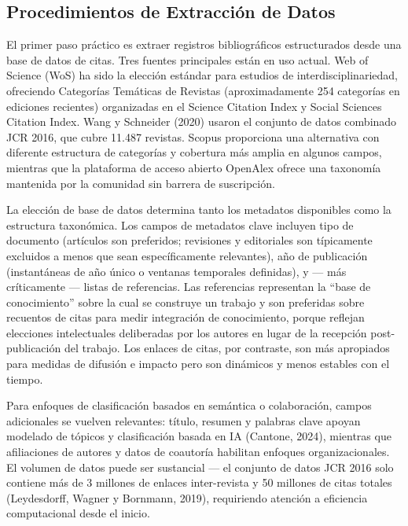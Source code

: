 \documentclass[
]{article}
\begin{document}
\hypertarget{procedimientos-de-extracciuxf3n-de-datos}{%
\subsection{Procedimientos de Extracción de
Datos}\label{procedimientos-de-extracciuxf3n-de-datos}}

El primer paso práctico es extraer registros bibliográficos
estructurados desde una base de datos de citas. Tres fuentes principales
están en uso actual. Web of Science (WoS) ha sido la elección estándar
para estudios de interdisciplinariedad, ofreciendo Categorías Temáticas
de Revistas (aproximadamente 254 categorías en ediciones recientes)
organizadas en el Science Citation Index y Social Sciences Citation
Index. Wang y Schneider (2020) usaron el conjunto de datos combinado JCR
2016, que cubre 11.487 revistas. Scopus proporciona una alternativa con
diferente estructura de categorías y cobertura más amplia en algunos
campos, mientras que la plataforma de acceso abierto OpenAlex ofrece una
taxonomía mantenida por la comunidad sin barrera de suscripción.

La elección de base de datos determina tanto los metadatos disponibles
como la estructura taxonómica. Los campos de metadatos clave incluyen
tipo de documento (artículos son preferidos; revisiones y editoriales
son típicamente excluidos a menos que sean específicamente relevantes),
año de publicación (instantáneas de año único o ventanas temporales
definidas), y --- más críticamente --- listas de referencias. Las
referencias representan la ``base de conocimiento'' sobre la cual se
construye un trabajo y son preferidas sobre recuentos de citas para
medir integración de conocimiento, porque reflejan elecciones
intelectuales deliberadas por los autores en lugar de la recepción
post-publicación del trabajo. Los enlaces de citas, por contraste, son
más apropiados para medidas de difusión e impacto pero son dinámicos y
menos estables con el tiempo.

Para enfoques de clasificación basados en semántica o colaboración,
campos adicionales se vuelven relevantes: título, resumen y palabras
clave apoyan modelado de tópicos y clasificación basada en IA (Cantone,
2024), mientras que afiliaciones de autores y datos de coautoría
habilitan enfoques organizacionales. El volumen de datos puede ser
sustancial --- el conjunto de datos JCR 2016 solo contiene más de 3
millones de enlaces inter-revista y 50 millones de citas totales
(Leydesdorff, Wagner y Bornmann, 2019), requiriendo atención a
eficiencia computacional desde el inicio.
\end{document}
